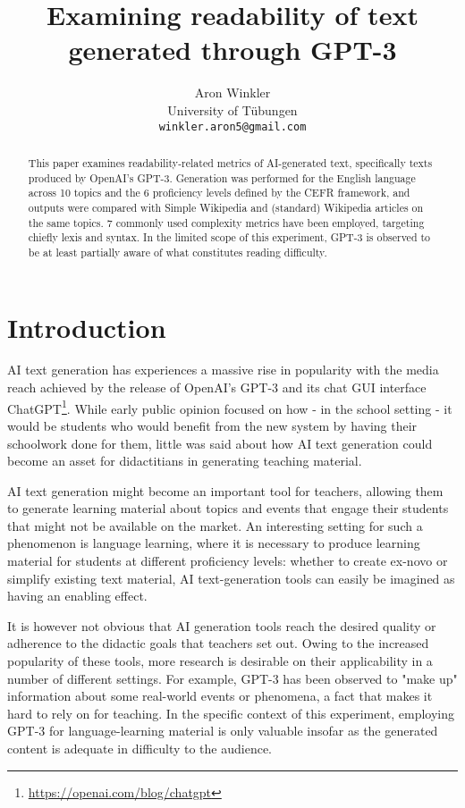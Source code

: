 \documentclass[11pt]{article}
\title{Examining readability of text generated through GPT-3 }
\author{Aron Winkler \\
  University of Tübungen \\
  \texttt{winkler.aron5@gmail.com}}
\begin{document}
\maketitle
\begin{abstract}
    This paper examines readability-related metrics of AI-generated text, specifically texts produced by OpenAI's GPT-3. Generation was performed for the English language across 10 topics and the 6 proficiency levels defined by the CEFR framework, and outputs were compared with Simple Wikipedia and (standard) Wikipedia articles on the same topics. 7 commonly used complexity metrics have been employed, targeting chiefly lexis and syntax. In the limited scope of this experiment, GPT-3 is observed to be at least partially aware of what constitutes reading difficulty.
\end{abstract}

\section{Introduction}

AI text generation has experiences a massive rise in popularity with the media reach achieved by the release of OpenAI's GPT-3 \citep{brown2020language} and its chat GUI interface ChatGPT\footnote{\url{https://openai.com/blog/chatgpt}}. While early public opinion focused on how - in the school setting - it would be students who would benefit from the new system by having their schoolwork done for them, little was said about how AI text generation could become an asset for didactitians in generating teaching material.

AI text generation might become an important tool for teachers, allowing them to generate learning material about topics and events that engage their students that might not be available on the market. An interesting setting for such a phenomenon is language learning, where it is necessary to produce learning material for students at different proficiency levels: whether to create ex-novo or simplify existing text material, AI text-generation tools can easily be imagined as having an enabling effect. 

It is however not obvious that AI generation tools reach the desired quality or adherence to the didactic goals that teachers set out. Owing to the increased popularity of these tools, more research is desirable on their applicability in a number of different settings. For example, GPT-3 has been observed to "make up" information about some real-world events or phenomena, a fact that makes it hard to rely on for teaching. In the specific context of this experiment, employing GPT-3 for language-learning material is only valuable insofar as the generated content is adequate in difficulty to the audience.
\end{document}
